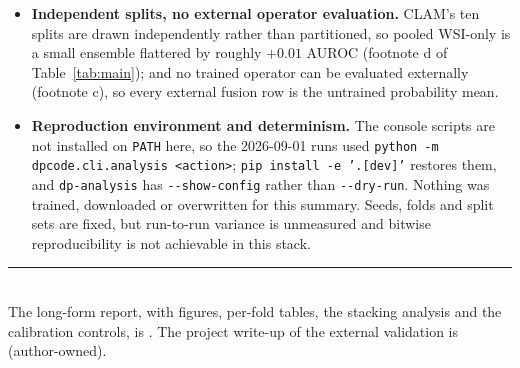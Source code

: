 \documentclass[10pt,a4paper]{article}
\begin{document}
\begin{itemize}
\item \textbf{Independent splits, no external operator evaluation.} CLAM's ten splits are drawn
independently rather than partitioned, so pooled WSI-only is a small ensemble flattered by roughly
$+0.01$ AUROC (footnote d of Table~\ref{tab:main}); and no trained operator can be evaluated
externally (footnote c), so every external fusion row is the untrained probability mean.

\item \textbf{Reproduction environment and determinism.} The console scripts are not installed on
\texttt{PATH} here, so the 2026-09-01 runs used
\texttt{python -m dpcode.cli.analysis <action>}; \texttt{pip install -e '.[dev]'} restores them, and
\texttt{dp-analysis} has \texttt{-{}-show-config} rather than \texttt{-{}-dry-run}. Nothing was
trained, downloaded or overwritten for this summary. Seeds, folds and split sets are fixed, but
run-to-run variance is unmeasured and bitwise reproducibility is not achievable in this stack.

\end{itemize}

\vspace{0.4em}
\noindent\rule{\linewidth}{0.4pt}\\
{\footnotesize The long-form report, with figures, per-fold tables, the stacking analysis and the
calibration controls, is . The project
write-up of the external validation is
 (author-owned).}
\end{document}
